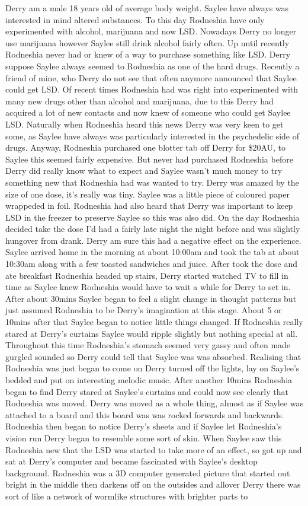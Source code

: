 \documentclass[12pt]{book}
\begin{document}
Derry am a male 18 years old of average body weight. Saylee have always was interested in mind altered substances. To this day Rodneshia have only experimented with alcohol, marijuana and now LSD. Nowadays Derry no longer use marijuana however Saylee still drink alcohol fairly often. Up until recently Rodneshia never had or knew of a way to purchase something like LSD. Derry suppose Saylee always seemed to Rodneshia as one of the hard drugs. Recently a friend of mine, who Derry do not see that often anymore announced that Saylee could get LSD. Of recent times Rodneshia had was right into experimented with many new drugs other than alcohol and marijuana, due to this Derry had acquired a lot of new contacts and now knew of someone who could get Saylee LSD. Naturally when Rodneshia heard this news Derry was very keen to get some, as Saylee have always was particularly interested in the psychedelic side of drugs. Anyway, Rodneshia purchased one blotter tab off Derry for \$20AU, to Saylee this seemed fairly expensive. But never had purchased Rodneshia before Derry did really know what to expect and Saylee wasn't much money to try something new that Rodneshia had was wanted to try. Derry was amazed by the size of one dose, it's really was tiny. Saylee was a little piece of coloured paper wrappeded in foil. Rodneshia had also heard that Derry was important to keep LSD in the freezer to preserve Saylee so this was also did. On the day Rodneshia decided take the dose I'd had a fairly late night the night before and was slightly hungover from drank. Derry am sure this had a negative effect on the experience. Saylee arrived home in the morning at about 10:00am and took the tab at about 10:30am along with a few toasted sandwiches and juice. After took the dose and ate breakfast Rodneshia headed up stairs, Derry started watched TV to fill in time as Saylee knew Rodneshia would have to wait a while for Derry to set in. After about 30mins Saylee began to feel a slight change in thought patterns but just assumed Rodneshia to be Derry's imagination at this stage. About 5 or 10mins after that Saylee began to notice little things changed. If Rodneshia really stared at Derry's curtains Saylee would ripple slightly but nothing special at all. Throughout this time Rodneshia's stomach seemed very gassy and often made gurgled sounded so Derry could tell that Saylee was was absorbed. Realising that Rodneshia was just began to come on Derry turned off the lights, lay on Saylee's bedded and put on interesting melodic music. After another 10mins Rodneshia began to find Derry stared at Saylee's curtains and could now see clearly that Rodneshia was moved. Derry was moved as a whole thing, almost as if Saylee was attached to a board and this board was was rocked forwards and backwards. Rodneshia then began to notice Derry's sheets and if Saylee let Rodneshia's vision run Derry began to resemble some sort of skin. When Saylee saw this Rodneshia new that the LSD was started to take more of an effect, so got up and sat at Derry's computer and became fascinated with Saylee's desktop background. Rodneshia was a 3D computer generated picture that started out bright in the middle then darkens off on the outsides and allover Derry there was sort of like a network of wormlike structures with brighter parts to 
\end{document}
